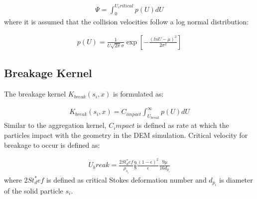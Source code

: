 \documentclass[preprint,10pt,authoryear,review]{elsarticle}
\begin{document}
\begin{align}
\Psi = \int_0^{U_critical} p(U)dU
\label{eqn:mthds_pbm_agg_psi}
\end{align}
where it is assumed that the collision velocities follow a log normal distribution:


\begin{align}
p(U) = \frac{1}{U\sqrt{2\pi}\sigma}\exp\left[-\frac{(lnU-\mu)^2}{2\sigma^2}\right]
\label{eqn:mthds_pbm_agg_lognormVelo}
\end{align}



\subsection{Breakage Kernel}
\label{app:breakKernel}
The breakage kernel $K_{break}(s_i,x)$ is formulated as: 

\begin{align}
K_{break}(s_i,x) = C_{impact}\int_{U_{break}}^{\infty}p(U)dU
\label{eqn:mthds_pbm_breakage_kernel}
\end{align}
Similar to the aggregation kernel, $C_impact$ is defined as rate at which 
the particles impact with the geometry in the DEM simulation. Critical velocity 
for breakage to occur is defined as:

\begin{align}
U_break=\frac{2St^*_def}{\rho_{s_i}}\frac{9}{8}\frac{(1-\epsilon)^2}{\epsilon}\frac{9\mu}{16d_{p_i}}
\label{eqn:mthds_pbm_breakage_ubreak}
\end{align}
where $2St^*_def$ is defined as critical Stokes deformation number \citep{Iveson2001} and 
$d_{p_i}$ is diameter of the solid particle $s_i$.






\end{document}
